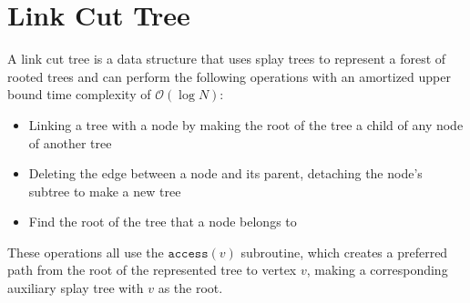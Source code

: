     
    
    \section{Link Cut Tree}
    A link cut tree is a data structure that uses splay trees to represent a forest of rooted trees and can perform the following operations with an amortized upper bound time complexity of $\mathcal{O}(\log N)$:
    \begin{itemize}
        \item Linking a tree with a node by making the root of the tree a child of any node of another tree
        \item Deleting the edge between a node and its parent, detaching the node's subtree to make a new tree
        \item Find the root of the tree that a node belongs to
    \end{itemize}

    These operations all use the $\texttt{access}(v)$ subroutine,
which creates a preferred path from the root of the represented tree to vertex $v$, making a corresponding auxiliary splay tree with $v$ as the root.

